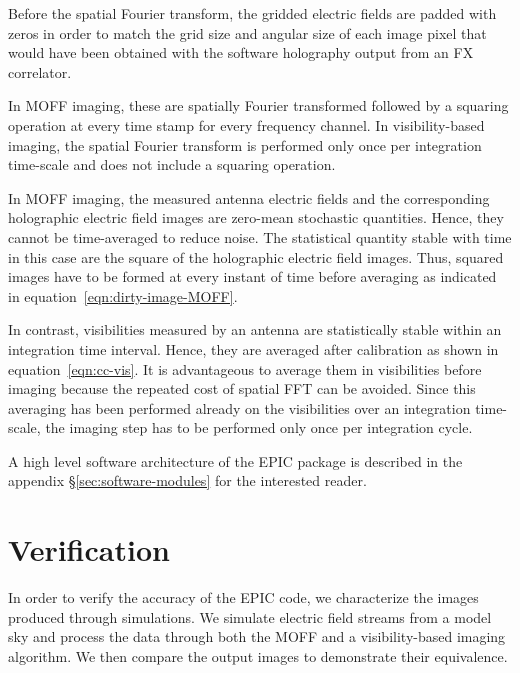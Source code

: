 \documentclass[a4paper,fleqn,usenatbib]{mnras}
\begin{document}
\par\medskip
{}
\par\medskip
\noindent Before the spatial Fourier transform, the gridded electric fields are 
padded with zeros in order to match the grid size and angular size of each image 
pixel that would have been obtained with the software holography output from an 
FX correlator. 

In MOFF imaging, these are spatially Fourier transformed followed by a squaring
operation at every time stamp for every frequency channel. In visibility-based 
imaging, the spatial Fourier transform is performed only once per integration 
time-scale and does not include a squaring operation.

\par\medskip
{}
\par\medskip
\noindent In MOFF imaging, the measured antenna electric fields and the 
corresponding holographic electric field images are zero-mean stochastic 
quantities. Hence, they cannot be time-averaged to reduce noise. The statistical 
quantity stable with time in this case are the square of the holographic 
electric field images. Thus, squared images have to be formed at every instant 
of time before averaging as indicated in equation~\ref{eqn:dirty-image-MOFF}.

In contrast, visibilities measured by an antenna are statistically stable within
an integration time interval. Hence, they are averaged after calibration as shown
in equation~\ref{eqn:cc-vis}. It is advantageous to average them in visibilities
before imaging because the repeated cost of spatial FFT can be avoided. Since 
this averaging has been performed already on the visibilities over an integration 
time-scale, the imaging step has to be performed only once per integration cycle. 

A high level software architecture of the EPIC package is described in the 
appendix \S\ref{sec:software-modules} for the interested reader.

\section{Verification}\label{sec:verify}

In order to verify the accuracy of the EPIC code, we characterize the images 
produced through simulations. We simulate electric field streams from a model 
sky and process the data through both the MOFF and a visibility-based imaging 
algorithm. We then compare the output images to demonstrate their equivalence.
\end{document}
